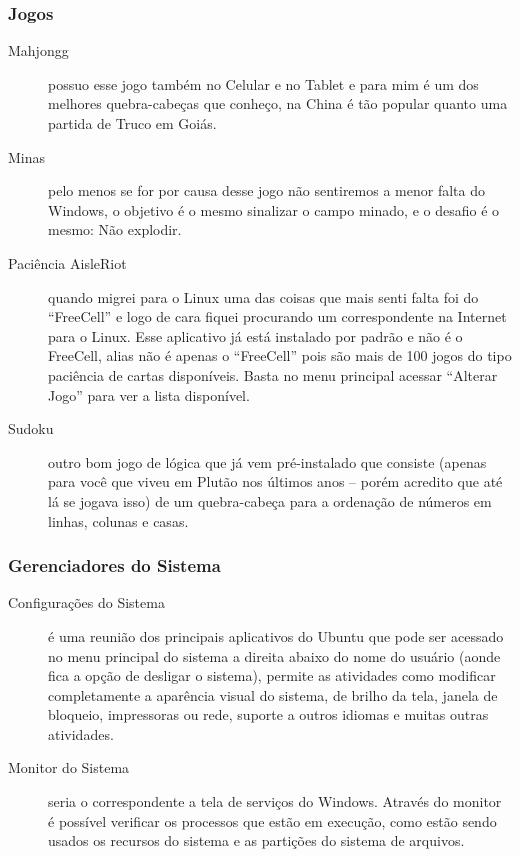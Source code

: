 \subsubsection{Jogos}
\begin{description}
 \item[Mahjongg] possuo esse jogo também no Celular e no Tablet e para mim é um dos melhores quebra-cabeças que conheço, na China é tão popular quanto uma partida de Truco em Goiás.
 \item[Minas] pelo menos se for por causa desse jogo não sentiremos a menor falta do Windows, o objetivo é o mesmo sinalizar o campo minado, e o desafio é o mesmo: Não explodir.
 \item[Paciência AisleRiot] quando migrei para o Linux uma das coisas que mais senti falta foi do ``FreeCell'' e logo de cara fiquei procurando um correspondente na Internet para o Linux. Esse aplicativo já está instalado por padrão e não é o FreeCell, alias não é apenas o ``FreeCell'' pois são mais de 100 jogos do tipo paciência de cartas disponíveis. Basta no menu principal acessar “Alterar Jogo” para ver a lista disponível.
 \item[Sudoku] outro bom jogo de lógica que já vem pré-instalado que consiste (apenas para você que viveu em Plutão nos últimos anos – porém acredito que até lá se jogava isso) de um quebra-cabeça para a ordenação de números em linhas, colunas e casas.
\end{description}

\subsubsection{Gerenciadores do Sistema}
\begin{description}
 \item[Configurações do Sistema] é uma reunião dos principais aplicativos do Ubuntu que pode ser acessado no menu principal do sistema a direita abaixo do nome do usuário (aonde fica a opção de desligar o sistema), permite as atividades como modificar completamente a aparência visual do sistema, de brilho da tela, janela de bloqueio, impressoras ou rede, suporte a outros idiomas e muitas outras atividades.
 \item[Monitor do Sistema] seria o correspondente a tela de serviços do Windows. Através do monitor é possível verificar os processos que estão em execução, como estão sendo usados os recursos do sistema e as partições do sistema de arquivos.
\end{description}
